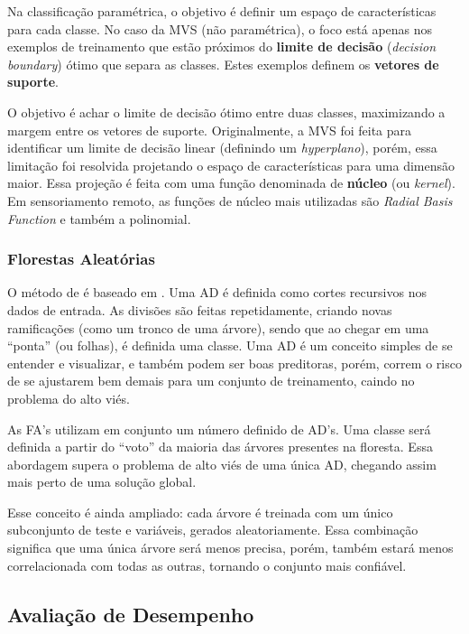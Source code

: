 Na classificação paramétrica, o objetivo é definir um espaço de
características para cada classe. No caso da MVS (não paramétrica), o
foco está apenas nos exemplos de treinamento que estão próximos do
\textbf{limite de decisão} (\emph{decision boundary}) ótimo que separa
as classes. Estes exemplos definem os \textbf{vetores de suporte}. \cite{maxwell}

O objetivo é achar o limite de decisão ótimo entre duas classes,
maximizando a margem entre os vetores de suporte. Originalmente, a MVS
foi feita para identificar um limite de decisão linear (definindo um
\emph{hyperplano}), porém, essa limitação foi resolvida projetando o
espaço de características para uma dimensão maior. Essa projeção é feita
com uma função denominada de \textbf{núcleo} (ou \emph{kernel}). Em
sensoriamento remoto, as funções de núcleo mais utilizadas são
\emph{Radial Basis Function} e também a polinomial. \cite{maxwell}

\subsubsection{Florestas Aleatórias}\label{florestas-aleatuxf3rias}

O método de  é baseado em . Uma \acs{AD} é definida
como cortes recursivos nos dados de entrada. As divisões são feitas
repetidamente, criando novas ramificações (como um tronco de uma
árvore), sendo que ao chegar em uma ``ponta'' (ou folhas), é definida
uma classe. Uma AD é um conceito simples de se entender e visualizar, e
também podem ser boas preditoras, porém, correm o risco de se ajustarem
bem demais para um conjunto de treinamento, caindo no problema do alto viés. \cite{maxwell}

As \acs{FA}'s utilizam em conjunto um número definido de
\acs{AD}'s. Uma classe será definida a partir do ``voto'' da maioria das
árvores presentes na floresta. Essa abordagem supera o problema de alto
viés de uma única \acs{AD}, chegando assim mais perto de uma solução global. \cite{maxwell}

Esse conceito é ainda ampliado: cada árvore é treinada com um único
subconjunto de teste e variáveis, gerados aleatoriamente. Essa
combinação significa que uma única árvore será menos precisa, porém,
também estará menos correlacionada com todas as outras, tornando o
conjunto mais confiável. \cite{maxwell}

\subsection{Avaliação de
Desempenho}\label{avaliauxe7uxe3o-de-desempenho}

